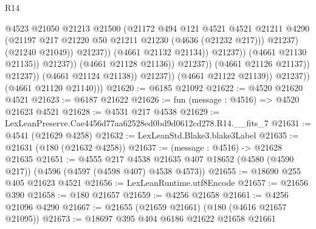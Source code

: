 \begin{lexlean}{R14}
\begin{coremodule}
                                                  @4523
                                                  @21050
                                                  @21213
                                                  @21500
                                                  (@21172
                                                    @494
                                                    @121
                                                    @4521
                                                    @4521
                                                    @21211
                                                    @4290
                                                    (@21197
                                                      @217
                                                      @21220
                                                      @50
                                                      @21211
                                                      @21230
                                                      (@4636 (@21232 @217)))
                                                    @21237)
                                                  (@21240 @21049))
                                                @21237))
                                            (@4661 @21132 @21134))
                                          @21237))
                                      (@4661 @21130 @21135))
                                    @21237))
                                (@4661 @21128 @21136))
                              @21237))
                          (@4661 @21126 @21137))
                        @21237))
                    (@4661 @21124 @21138))
                  @21237))
              (@4661 @21122 @21139))
            @21237))
        (@4661 @21120 @21140)))
@21620 := @6185 @21092
@21622 := @4520 @21620 @4521
@21623 := @6187 @21622
@21626 := fun (message : @4516) => @4520 @21623 @4521
@21628 := @4531 @217 @4538
@21629 := LexLeanPreserve.Cae4456d77aa62528ed0bd9d0612cd278.R14.__fits_7
@21631 := @4541 (@21629 @4258)
@21632 := LexLeanStd.Blake3.blake3Label
@21635 := @21631 (@180 (@21632 @4258))
@21637 := (message : @4516) -> @21628 @21635
@21651 := @4555
    @217
    @4538
    @21635
    @407
    @18652
    (@4580 (@4590 @217))
    (@4596 (@4597 (@4598 @407) @4538 @4573))
@21655 := @18690 @255 @405 @21623 @4521
@21656 := LexLeanRuntime.utf8Encode
@21657 := @21656 @390
@21658 := @180 @21657
@21659 := @4256 @21658
@21661 := @4256 @21096 @4290
@21667 := @21655 (@21659 @21661) (@180 (@4616 @21657 @21095))
@21673 := @18697 @395 @404 @6186 @21622 @21658 @21661

\end{coremodule}
\end{lexlean}
